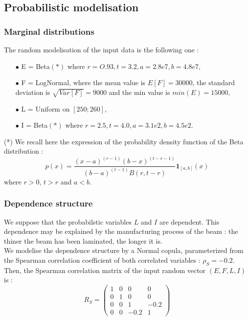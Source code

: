 \documentclass[11pt]{article}
\begin{document}
\subsection{Probabilistic modelisation}

\subsubsection{Marginal distributions}

The random modelisation of the input data is the following one :
\begin{itemize}
\item[$\bullet$] E = Beta$(*)$ where $r = O.93,t = 3.2,a = 2.8e7,b = 4.8e7$,
\item[$\bullet$] F  = LogNormal, where the mean value is $E[F] = 30000$, the standard deviation is $\sqrt{Var[F]} = 9000$ and the min value is $min(E) = 15000$,
\item[$\bullet$] L  = Uniform on $[250; 260]$,
\item[$\bullet$] I  = Beta$(*)$ where $r = 2.5,t = 4.0,a = 3.1e2,b = 4.5e2$.
\end{itemize}
(*) We recall here the expression of the probability density function of the Beta distribution :
$$
\displaystyle  p(x) = \frac{(x-a)^{(r-1)}(b-x)^{(t-r-1)}}{(b-a)^{(t-1)}B(r,t-r)}\boldsymbol{1}_{[a,b]}(x)
$$
where $r>0$, $t>r$ and $a < b$.



\subsubsection{Dependence structure}

We suppose that the probabilstic variables $L$ and $I$ are dependent. This dependence may be explained by the manufacturing process of the beam : the thiner the beam has been laminated, the longer it is.\\
We modelise the dependence structure by a Normal copula, parameterized from the Spearman correlation coefficient of both correlated variables : $\rho_S = -0.2$.\\
Then, the Spearman correlation matrix of the input random vector $(E,F,L,I)$ is :
$$
R_S = \left (
  \begin{array}{cccc}
    1 & 0 & 0 & 0 \\
    0 & 1 & 0 & 0 \\
    0 & 0 & 1 & -0.2 \\
    0 & 0 & -0.2 & 1
  \end{array}
\right)
$$
\end{document}
